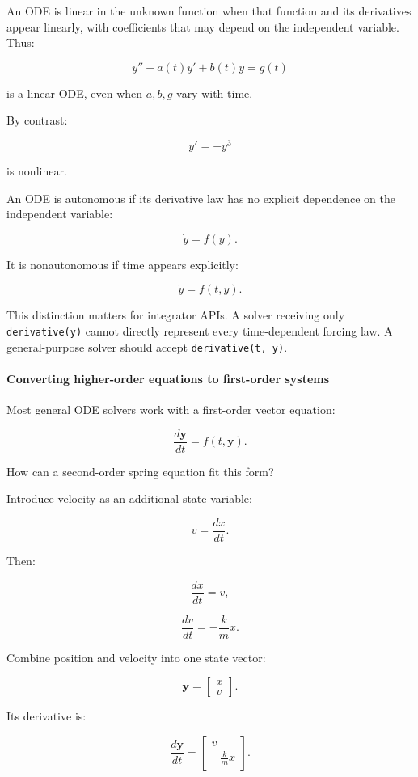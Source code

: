 An ODE is linear in the unknown function when that function and its derivatives appear linearly, with coefficients that may depend on the independent variable. Thus:

\[
y''+a(t)y'+b(t)y=g(t)
\]

is a linear ODE, even when \(a,b,g\) vary with time.

By contrast:

\[
y'=-y^3
\]

is nonlinear.

An ODE is autonomous if its derivative law has no explicit dependence on the independent variable:

\[
\dot y=f(y).
\]

It is nonautonomous if time appears explicitly:

\[
\dot y=f(t,y).
\]

This distinction matters for integrator APIs. A solver receiving only \texttt{derivative(y)} cannot directly represent every time-dependent forcing law. A general-purpose solver should accept \texttt{derivative(t,\ y)}.

\paragraph{Converting higher-order equations to first-order systems}\label{02-foundations-ii-ch022-converting-higher-order-equations-to-first-order-systems}

Most general ODE solvers work with a first-order vector equation:

\[
\boxed{ \frac{d\mathbf y}{dt}=f(t,\mathbf y) }.
\]

How can a second-order spring equation fit this form?

Introduce velocity as an additional state variable:

\[
v=\frac{dx}{dt}.
\]

Then:

\[
\frac{dx}{dt}=v,
\]

\[
\frac{dv}{dt}=-\frac{k}{m}x.
\]

Combine position and velocity into one state vector:

\[
\mathbf y= \begin{bmatrix} x\\v \end{bmatrix}.
\]

Its derivative is:

\[
\boxed{ \frac{d\mathbf y}{dt} = \begin{bmatrix} v\\ -\frac{k}{m}x \end{bmatrix} }.
\]

